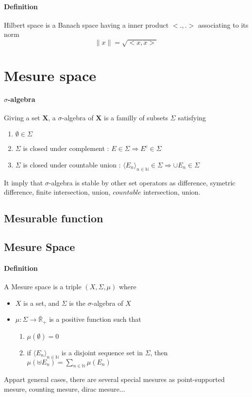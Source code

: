 \documentclass[a4paper,10pt]{article}
\begin{document}
\paragraph{Definition} Hilbert space is a Banach space having a inner product $<.,.>$ associating to its norm
\[
\| x \| = \sqrt{<x,x>}
\]





\section{Mesure space}
\paragraph{$\sigma$-algebra} Giving a set $\textbf{X}$, a $\sigma$-algebra of $\textbf{X}$ is a familly of subsets $\Sigma$ satisfying 
\begin{enumerate}
 \item $\emptyset \in \Sigma$
 \item $\Sigma$ is closed under complement : $ E \in \Sigma \Longrightarrow E^{c} \in \Sigma$
 \item $\Sigma$ is closed under countable union : $ \langle E_{n} \rangle_{n \in \mathbb{N}} \in \Sigma \Longrightarrow \cup E_{n} \in \Sigma $ 
\end{enumerate}
It imply that $\sigma$-algebra is stable by other set operators as difference, symetric difference, finite intersection, union, $\textit{countable}$ intersection, union. 

\subsection{Mesurable function}

\subsection{Mesure Space}
\paragraph{Definition} A Mesure space is a triple $(X,\Sigma,\mu)$ where
\begin{itemize}
 \item $X$ is a set, and $\Sigma$ is the $\sigma$-algebra of $X$
 \item $\mu : \Sigma \longrightarrow \bar{\mathbb{R}}_{+}$ is a positive function such that
 \begin{enumerate}
  \item $\mu(\emptyset) = 0$
  \item if $\langle E_{n} \rangle_{n \in \mathbb{N}}$ is a disjoint sequence set in $\Sigma$, then $\mu(\uplus E_{n}) = \sum_{n \in \mathbb{N}}\mu(E_n) $
 \end{enumerate}
\end{itemize}
Appart general cases, there are several special mesures as point-supported mesure, counting mesure, dirac mesure...
\end{document}
